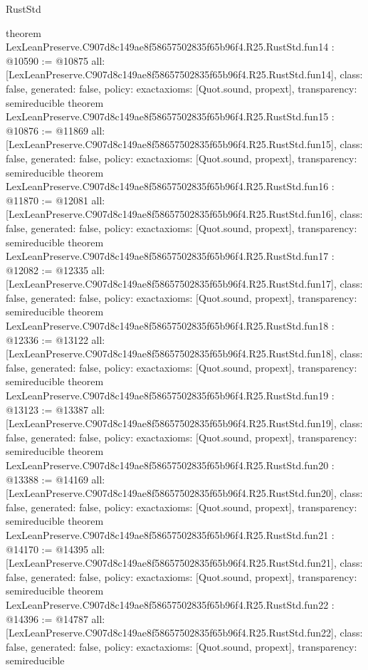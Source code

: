 \begin{lexlean}{RustStd}
\begin{coremodule}
{}
theorem LexLeanPreserve.C907d8c149ae8f58657502835f65b96f4.R25.RustStd.fun14 : @10590 := @10875 {
  all: [LexLeanPreserve.C907d8c149ae8f58657502835f65b96f4.R25.RustStd.fun14],
  class: false,
  generated: false,
  policy: exact{axioms: [Quot.sound, propext]},
  transparency: semireducible
}
theorem LexLeanPreserve.C907d8c149ae8f58657502835f65b96f4.R25.RustStd.fun15 : @10876 := @11869 {
  all: [LexLeanPreserve.C907d8c149ae8f58657502835f65b96f4.R25.RustStd.fun15],
  class: false,
  generated: false,
  policy: exact{axioms: [Quot.sound, propext]},
  transparency: semireducible
}
theorem LexLeanPreserve.C907d8c149ae8f58657502835f65b96f4.R25.RustStd.fun16 : @11870 := @12081 {
  all: [LexLeanPreserve.C907d8c149ae8f58657502835f65b96f4.R25.RustStd.fun16],
  class: false,
  generated: false,
  policy: exact{axioms: [Quot.sound, propext]},
  transparency: semireducible
}
theorem LexLeanPreserve.C907d8c149ae8f58657502835f65b96f4.R25.RustStd.fun17 : @12082 := @12335 {
  all: [LexLeanPreserve.C907d8c149ae8f58657502835f65b96f4.R25.RustStd.fun17],
  class: false,
  generated: false,
  policy: exact{axioms: [Quot.sound, propext]},
  transparency: semireducible
}
theorem LexLeanPreserve.C907d8c149ae8f58657502835f65b96f4.R25.RustStd.fun18 : @12336 := @13122 {
  all: [LexLeanPreserve.C907d8c149ae8f58657502835f65b96f4.R25.RustStd.fun18],
  class: false,
  generated: false,
  policy: exact{axioms: [Quot.sound, propext]},
  transparency: semireducible
}
theorem LexLeanPreserve.C907d8c149ae8f58657502835f65b96f4.R25.RustStd.fun19 : @13123 := @13387 {
  all: [LexLeanPreserve.C907d8c149ae8f58657502835f65b96f4.R25.RustStd.fun19],
  class: false,
  generated: false,
  policy: exact{axioms: [Quot.sound, propext]},
  transparency: semireducible
}
theorem LexLeanPreserve.C907d8c149ae8f58657502835f65b96f4.R25.RustStd.fun20 : @13388 := @14169 {
  all: [LexLeanPreserve.C907d8c149ae8f58657502835f65b96f4.R25.RustStd.fun20],
  class: false,
  generated: false,
  policy: exact{axioms: [Quot.sound, propext]},
  transparency: semireducible
}
theorem LexLeanPreserve.C907d8c149ae8f58657502835f65b96f4.R25.RustStd.fun21 : @14170 := @14395 {
  all: [LexLeanPreserve.C907d8c149ae8f58657502835f65b96f4.R25.RustStd.fun21],
  class: false,
  generated: false,
  policy: exact{axioms: [Quot.sound, propext]},
  transparency: semireducible
}
theorem LexLeanPreserve.C907d8c149ae8f58657502835f65b96f4.R25.RustStd.fun22 : @14396 := @14787 {
  all: [LexLeanPreserve.C907d8c149ae8f58657502835f65b96f4.R25.RustStd.fun22],
  class: false,
  generated: false,
  policy: exact{axioms: [Quot.sound, propext]},
  transparency: semireducible
}
\end{coremodule}
\end{lexlean}

